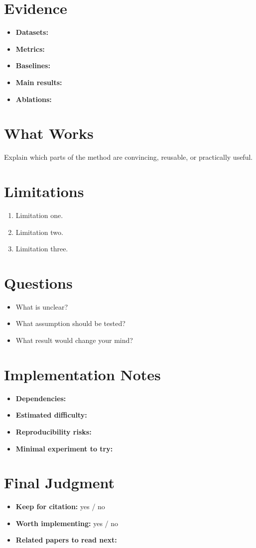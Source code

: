 \documentclass[11pt]{article}
\begin{document}
\section*{Evidence}

\begin{itemize}
  \item \textbf{Datasets:}
  \item \textbf{Metrics:}
  \item \textbf{Baselines:}
  \item \textbf{Main results:}
  \item \textbf{Ablations:}
\end{itemize}

\section*{What Works}

Explain which parts of the method are convincing, reusable, or practically useful.

\section*{Limitations}

\begin{enumerate}
  \item Limitation one.
  \item Limitation two.
  \item Limitation three.
\end{enumerate}

\section*{Questions}

\begin{itemize}
  \item What is unclear?
  \item What assumption should be tested?
  \item What result would change your mind?
\end{itemize}

\section*{Implementation Notes}

\begin{itemize}
  \item \textbf{Dependencies:}
  \item \textbf{Estimated difficulty:}
  \item \textbf{Reproducibility risks:}
  \item \textbf{Minimal experiment to try:}
\end{itemize}

\section*{Final Judgment}

\begin{itemize}
  \item \textbf{Keep for citation:} yes / no
  \item \textbf{Worth implementing:} yes / no
  \item \textbf{Related papers to read next:}
\end{itemize}
\end{document}
